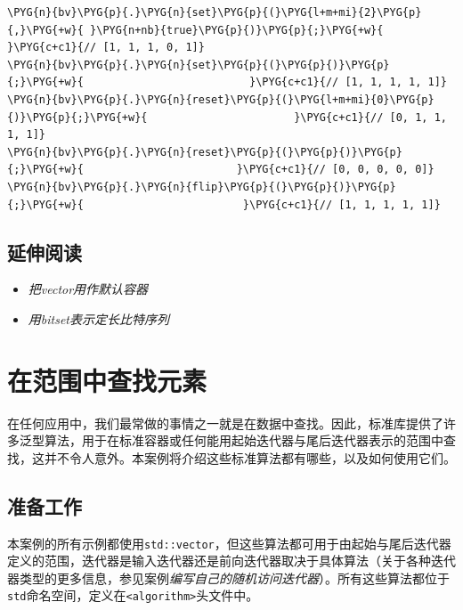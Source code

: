 \begin{codeblockbg}
\begin{Verbatim}[commandchars=\\\{\},breaklines=true,breakanywhere=true,fontsize=\codefont,xleftmargin=17bp]
\PYG{n}{bv}\PYG{p}{.}\PYG{n}{set}\PYG{p}{(}\PYG{l+m+mi}{2}\PYG{p}{,}\PYG{+w}{ }\PYG{n+nb}{true}\PYG{p}{)}\PYG{p}{;}\PYG{+w}{                   }\PYG{c+c1}{// [1, 1, 1, 0, 1]}
\PYG{n}{bv}\PYG{p}{.}\PYG{n}{set}\PYG{p}{(}\PYG{p}{)}\PYG{p}{;}\PYG{+w}{                          }\PYG{c+c1}{// [1, 1, 1, 1, 1]}
\PYG{n}{bv}\PYG{p}{.}\PYG{n}{reset}\PYG{p}{(}\PYG{l+m+mi}{0}\PYG{p}{)}\PYG{p}{;}\PYG{+w}{                       }\PYG{c+c1}{// [0, 1, 1, 1, 1]}
\PYG{n}{bv}\PYG{p}{.}\PYG{n}{reset}\PYG{p}{(}\PYG{p}{)}\PYG{p}{;}\PYG{+w}{                        }\PYG{c+c1}{// [0, 0, 0, 0, 0]}
\PYG{n}{bv}\PYG{p}{.}\PYG{n}{flip}\PYG{p}{(}\PYG{p}{)}\PYG{p}{;}\PYG{+w}{                         }\PYG{c+c1}{// [1, 1, 1, 1, 1]}
\end{Verbatim}
\end{codeblockbg}



\subsection{延伸阅读}



\begin{itemize}
\item \textit{把vector用作默认容器}



\item \textit{用bitset表示定长比特序列}

\end{itemize}



\section{在范围中查找元素}



在任何应用中，我们最常做的事情之一就是在数据中查找。因此，标准库提供了许多泛型算法，用于在标准容器或任何能用起始迭代器与尾后迭代器表示的范围中查找，这并不令人意外。本案例将介绍这些标准算法都有哪些，以及如何使用它们。



\subsection{准备工作}



本案例的所有示例都使用\texttt{std::\allowbreak{}vector}，但这些算法都可用于由起始与尾后迭代器定义的范围，迭代器是输入迭代器还是前向迭代器取决于具体算法（关于各种迭代器类型的更多信息，参见案例\textit{编写自己的随机访问迭代器}）。所有这些算法都位于\texttt{std}命名空间，定义在\texttt{<\allowbreak{}algorithm>}头文件中。


